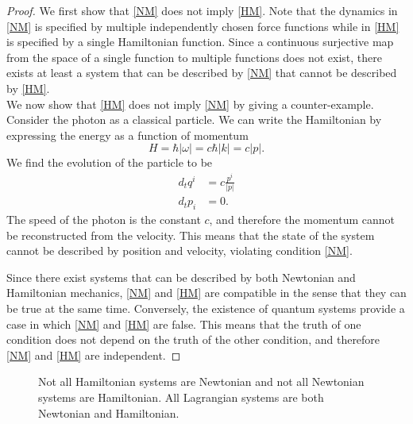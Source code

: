 \documentclass{techbrief}
\begin{document}
	\begin{proof}
	We first show that \ref{NM} does not imply \ref{HM}. Note that the dynamics in \ref{NM} is specified by multiple independently chosen force functions while in \ref{HM} is specified by a single Hamiltonian function. Since a continuous surjective map from the space of a single function to multiple functions does not exist, there exists at least a system that can be described by \ref{NM} that cannot be described by \ref{HM}. \\

	We now show that \ref{HM} does not imply \ref{NM} by giving a counter-example. Consider the photon as a classical particle. We can write the Hamiltonian by expressing the energy as a function of momentum
	\begin{equation}
		H=\hbar | \omega| = c \hbar |k| = c |p|.
	\end{equation}
	We find the evolution of the particle to be
	\begin{equation}
		\begin{aligned}
			d_t q^i &= c \frac{p^i}{|p|} \\
			d_t p_i &= 0.
		\end{aligned}
	\end{equation} 
	The speed of the photon is the constant $c$, and therefore the momentum cannot be reconstructed from the velocity. This means that the state of the system cannot be described by position and velocity, violating condition \ref{NM}.
	
	Since there exist systems that can be described by both Newtonian and Hamiltonian mechanics, \ref{NM} and \ref{HM} are compatible in the sense that they can be true at the same time. Conversely, the existence of quantum systems provide a case in which \ref{NM} and \ref{HM} are false. This means that the truth of one condition does not depend on the truth of the other condition, and therefore \ref{NM} and \ref{HM} are independent.
	\end{proof}
	
	\begin{figure}[h]
		\centering
		\caption {Not all Hamiltonian systems are Newtonian and not all Newtonian systems are Hamiltonian. All Lagrangian systems are both Newtonian and Hamiltonian.}\label{rp-cm-fig-vennDiagramEarly}
	\end{figure}
\end{document}
